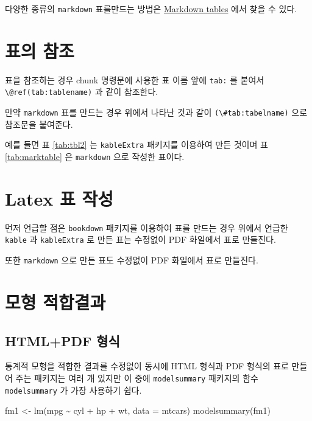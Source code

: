 \documentclass[
]{book}
\newenvironment{Shaded}{\begin{snugshade}}{\end{snugshade}}
\newcommand{\AttributeTok}[1]{\textcolor[rgb]{0.77,0.63,0.00}{#1}}
\newcommand{\FunctionTok}[1]{\textcolor[rgb]{0.00,0.00,0.00}{#1}}
\newcommand{\NormalTok}[1]{#1}
\newcommand{\OtherTok}[1]{\textcolor[rgb]{0.56,0.35,0.01}{#1}}
\newcommand{\SpecialCharTok}[1]{\textcolor[rgb]{0.00,0.00,0.00}{#1}}
\theoremstyle{definition}
\theoremstyle{definition}
\theoremstyle{definition}
\theoremstyle{definition}
\theoremstyle{remark}
\begin{document}
다양한 종류의 \texttt{markdown} 표를만드는 방법은 \href{http://pandoc.org/MANUAL.html\#tables}{Markdown tables} 에서 찾을 수 있다.

\hypertarget{uxd45cuxc758-uxcc38uxc870}{%
\section{표의 참조}\label{uxd45cuxc758-uxcc38uxc870}}

표을 참조하는 경우 chunk 명령문에 사용한 표 이름 앞에 \texttt{tab:} 를 붙여서 \texttt{\textbackslash{}@ref(tab:tablename)} 과 같이 참조한다.

만약 \texttt{markdown} 표를 만드는 경우 위에서 나타난 것과 같이 \texttt{(\textbackslash{}\#tab:tabelname)} 으로
참조문을 붙여준다.

예를 들면 표 \ref{tab:tbl2} 는 \texttt{kableExtra} 패키지를 이용하여 만든 것이며
표 \ref{tab:marktable} 은 \texttt{markdown} 으로 작성한 표이다.

\hypertarget{latex-uxd45c-uxc791uxc131}{%
\section{Latex 표 작성}\label{latex-uxd45c-uxc791uxc131}}

먼저 언급할 점은 \texttt{bookdown} 패키지를 이용하여 표를 만드는 경우 위에서 언급한
\texttt{kable} 과 \texttt{kableExtra} 로 만든 표는 수정없이 PDF 화일에서 표로 만들진다.

또한 \texttt{markdown} 으로 만든 표도 수정없이 PDF 화일에서 표로 만들진다.

\hypertarget{uxbaa8uxd615-uxc801uxd569uxacb0uxacfc}{%
\section{모형 적합결과}\label{uxbaa8uxd615-uxc801uxd569uxacb0uxacfc}}

\hypertarget{htmlpdf-uxd615uxc2dd}{%
\subsection{HTML+PDF 형식}\label{htmlpdf-uxd615uxc2dd}}

통계적 모형을 적합한 결과를 수정없이 동시에 HTML 형식과 PDF 형식의 표로 만들어 주는 패키지는 여러 개 있지만 이 중에 \texttt{modelsummary} 패키지의 함수 \texttt{modelsummary} 가 가장 사용하기 쉽다.

\begin{Shaded}
\begin{Highlighting}[]
\NormalTok{fm1 }\OtherTok{\textless{}{-}} \FunctionTok{lm}\NormalTok{(mpg }\SpecialCharTok{\textasciitilde{}}\NormalTok{ cyl }\SpecialCharTok{+}\NormalTok{ hp }\SpecialCharTok{+}\NormalTok{ wt, }\AttributeTok{data =}\NormalTok{ mtcars)}
\FunctionTok{modelsummary}\NormalTok{(fm1)}
\end{Highlighting}
\end{Shaded}
\end{document}
